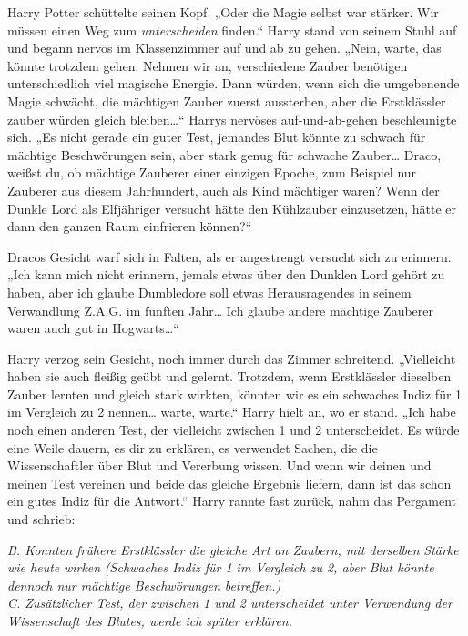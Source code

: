 {Harry Potter schüttelte seinen Kopf. „Oder die Magie selbst war stärker. Wir müssen einen Weg zum \emph{unterscheiden} finden.“ Harry stand von seinem Stuhl auf und begann nervös im Klassenzimmer auf und ab zu gehen. „Nein, warte, das könnte trotzdem gehen. Nehmen wir an, verschiedene Zauber benötigen unterschiedlich viel magische Energie. Dann würden, wenn sich die umgebenende Magie schwächt, die mächtigen Zauber zuerst aussterben, aber die Erstklässler zauber würden gleich bleiben…“ Harrys nervöses auf-und-ab-gehen beschleunigte sich. „Es nicht gerade ein guter Test, jemandes Blut könnte zu schwach für mächtige Beschwörungen sein, aber stark genug für schwache Zauber… Draco, weißst du, ob mächtige Zauberer einer einzigen Epoche, zum Beispiel nur Zauberer aus diesem Jahrhundert, auch als Kind mächtiger waren? Wenn der Dunkle Lord als Elfjähriger versucht hätte den Kühlzauber einzusetzen, hätte er dann den ganzen Raum einfrieren können?“

Dracos Gesicht warf sich in Falten, als er angestrengt versucht sich zu erinnern. „Ich kann mich nicht erinnern, jemals etwas über den Dunklen Lord gehört zu haben, aber ich glaube Dumbledore soll etwas Herausragendes in seinem Verwandlung Z.A.G. im fünften Jahr… Ich glaube andere mächtige Zauberer waren auch gut in Hogwarts…“

Harry verzog sein Gesicht, noch immer durch das Zimmer schreitend. „Vielleicht haben sie auch fleißig geübt und gelernt. Trotzdem, wenn Erstklässler dieselben Zauber lernten und gleich stark wirkten, könnten wir es ein schwaches Indiz für 1 im Vergleich zu 2 nennen… warte, warte.“ Harry hielt an, wo er stand. „Ich habe noch einen anderen Test, der vielleicht zwischen 1 und 2 unterscheidet. Es würde eine Weile dauern, es dir zu erklären, es verwendet Sachen, die die Wissenschaftler über Blut und Vererbung wissen. Und wenn wir deinen und meinen Test vereinen und beide das gleiche Ergebnis liefern, dann ist das schon ein gutes Indiz für die Antwort.“ Harry rannte fast zurück, nahm das Pergament und schrieb:

\emph{B. Konnten frühere Erstklässler die gleiche Art an Zaubern, mit derselben} \emph{Stärke wie heute} \emph{wirken} \emph{(Schwaches Indiz für 1 im Vergleich zu 2, aber Blut könnte dennoch nur mächtige Beschwörungen betreffen.)}\\ \emph{C. Zusätzlicher Test, der zwischen 1 und 2 unterscheidet unter Verwendung der Wissenschaft des Blutes, werde ich später erklären.}

}
